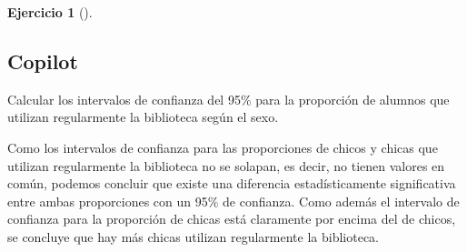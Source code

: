 \documentclass[
  a4paper,
]{scrreport}
\newenvironment{Shaded}{\begin{snugshade}}{\end{snugshade}}
\newcommand{\ExtensionTok}[1]{\textcolor[rgb]{0.00,0.23,0.31}{#1}}
\newcommand{\NormalTok}[1]{\textcolor[rgb]{0.00,0.23,0.31}{#1}}
\theoremstyle{definition}
\newtheorem{exercise}{Ejercicio}[chapter]
\theoremstyle{remark}
\begin{document}
\begin{exercise}[]
\begin{enumerate}
\begin{tcolorbox}
  \section{Copilot}

\begin{Shaded}
\begin{Highlighting}[]
\ExtensionTok{Calcular}\NormalTok{ los intervalos de confianza del 95\% para la proporción de alumnos  que utilizan regularmente la biblioteca según el sexo.}
\end{Highlighting}
\end{Shaded}

  Como los intervalos de confianza para las proporciones de chicos y
  chicas que utilizan regularmente la biblioteca no se solapan, es
  decir, no tienen valores en común, podemos concluir que existe una
  diferencia estadísticamente significativa entre ambas proporciones con
  un 95\% de confianza. Como además el intervalo de confianza para la
  proporción de chicas está claramente por encima del de chicos, se
  concluye que hay más chicas utilizan regularmente la biblioteca.

  \end{tcolorbox}
\end{enumerate}

\end{exercise}
\end{document}
